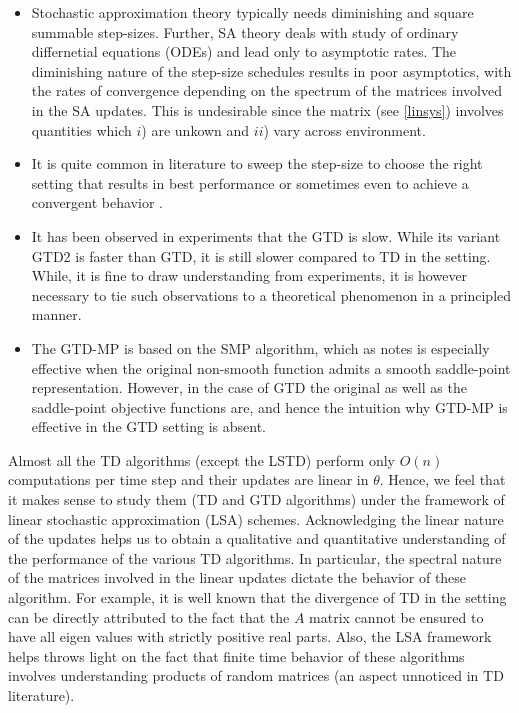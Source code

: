 \begin{itemize}[leftmargin=*]
\item Stochastic approximation \cite{SA} theory typically needs diminishing and square summable step-sizes. Further, SA theory deals with study of ordinary differnetial equations (ODEs) and lead only to asymptotic rates. The diminishing nature of the step-size schedules results in poor asymptotics, with the rates of convergence depending on the spectrum of the matrices involved in the SA updates. This is undesirable since the matrix (see \eqref{linsys}) involves quantities which $i$) are unkown and $ii$) vary across environment.
\item It is quite common in literature to sweep the step-size to choose the right setting that results in best performance or sometimes even to achieve a convergent behavior \cite{}.
\item It has been observed in experiments that the GTD is slow. While its variant GTD2 is faster than GTD, it is still slower compared to TD in the \onp setting. While, it is fine to draw understanding from experiments, it is however necessary to tie such observations to a theoretical phenomenon in a principled manner.
\item The GTD-MP is based on the SMP algorithm, which as \cite{} notes is especially effective when the original non-smooth function admits a smooth saddle-point representation. However, in the case of GTD the original as well as the saddle-point objective functions are, and hence the intuition why GTD-MP is effective in the GTD setting is absent.
\end{itemize}
Almost all the TD algorithms (except the LSTD) perform only $O(n)$ computations per time step and their updates are linear in $\theta$. Hence, we feel that it makes sense to study them (TD and GTD algorithms) under the framework of linear stochastic approximation (LSA) schemes. Acknowledging the linear nature of the updates helps us to obtain a qualitative and quantitative understanding of the performance of the various TD algorithms. In particular, the spectral nature of the matrices involved in the linear updates dictate the behavior of these algorithm. For example, it is well known that the divergence of TD in the \ofp setting can be directly attributed to the fact that the $A$ matrix cannot be ensured to have all eigen values with strictly positive real parts. Also, the LSA framework helps throws light on the fact that finite time behavior of these algorithms involves understanding products of random matrices (an aspect unnoticed in TD literature).\par
